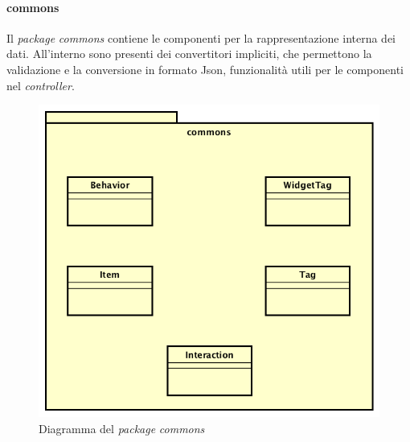 \paragraph*{commons}
Il \emph{package} \emph{commons} contiene le componenti per la rappresentazione interna dei dati. All'interno sono presenti dei convertitori impliciti, che permettono la validazione e la conversione in formato Json, funzionalità utili per le componenti nel \emph{controller}. 
\begin{figure}[h]
\centering
\includegraphics[scale=0.28]{immagini/commons}
\caption{Diagramma del \emph{package} \emph{commons}}
\label{fig:pack-commons}
\end{figure}
